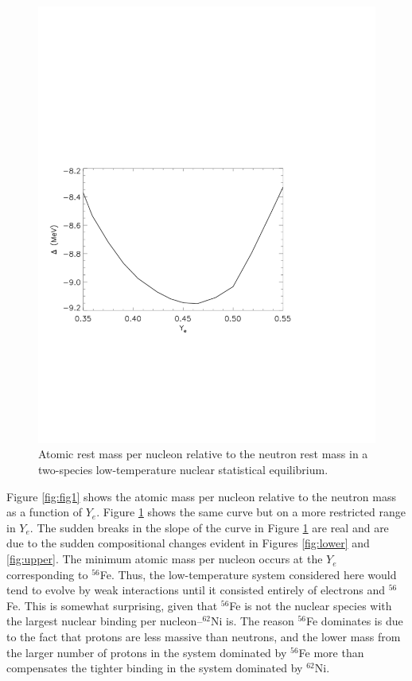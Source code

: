\documentclass{article}    %
\begin{document}
\begin{figure}[htp]
\centering
\includegraphics[width=5in]{figures/fig2}
\caption{Atomic rest mass per nucleon relative to the neutron rest mass in a
two-species low-temperature nuclear statistical equilibrium.}
\label{fig:fig2}
\end{figure}

Figure \ref{fig:fig1} shows the atomic mass per nucleon
relative to the neutron mass as a function of $Y_e$.  Figure \ref{fig:fig2}
shows the same curve but on a more restricted range in $Y_e$.  The
sudden breaks in the slope of the curve in Figure \ref{fig:fig2} are real
and are due to the sudden compositional changes evident in Figures
\ref{fig:lower} and \ref{fig:upper}.  The minimum atomic
mass per nucleon occurs at the $Y_e$ corresponding to $^{56}$Fe.  Thus,
the low-temperature system considered here would tend to evolve by weak
interactions until it consisted entirely of electrons and $^{56}$Fe.
This is somewhat surprising, given that $^{56}$Fe is not the nuclear
species with the largest nuclear binding per nucleon--$^{62}$Ni is.  The
reason $^{56}$Fe dominates is due to the fact that protons are less
massive than neutrons, and the lower mass from the
larger number of protons in the system dominated by $^{56}$Fe more
than compensates the tighter binding in the system dominated by
$^{62}$Ni.
\end{document}
